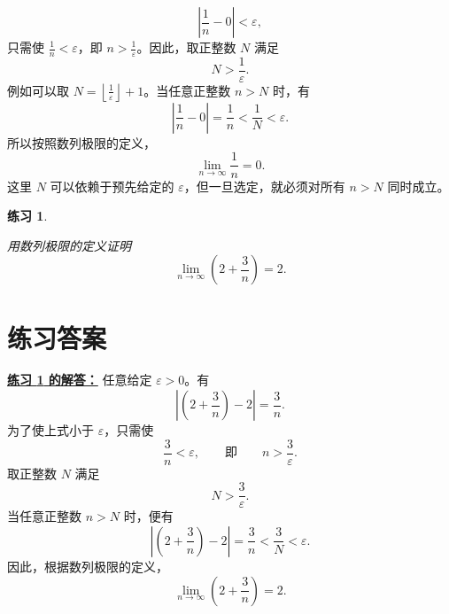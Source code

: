 \documentclass[UTF8,fontset=fandol,11pt]{ctexart}
\newtheorem{exercise}[definition]{练习}
\begin{document}
\[
\left|\frac{1}{n}-0\right|<\varepsilon,
\]
只需使 $\frac{1}{n}<\varepsilon$，即 $n>\frac{1}{\varepsilon}$。因此，取正整数 $N$ 满足
\[
N>\frac{1}{\varepsilon}.
\]
例如可以取 $N=\left\lfloor\frac{1}{\varepsilon}\right\rfloor+1$。当任意正整数 $n>N$ 时，有
\[
\left|\frac{1}{n}-0\right|=\frac{1}{n}<\frac{1}{N}<\varepsilon.
\]
所以按照数列极限的定义，
\[
\lim_{n\to\infty}\frac{1}{n}=0.
\tag{1}\label{eq:reciprocal-limit}
\]
这里 $N$ 可以依赖于预先给定的 $\varepsilon$，但一旦选定，就必须对所有 $n>N$ 同时成立。
\par
\begin{exercise}
\label{mathagent:exercise:00f3ca86b052020f03928eb8b6a5b7fd0cc5cf9711fabd7b41e6a358cfff3ed4}

用数列极限的定义证明
\[
\lim_{n\to\infty}\left(2+\frac{3}{n}\right)=2.
\]

\end{exercise}
\section*{练习答案}
\par\noindent\textbf{\hyperref[mathagent:exercise:00f3ca86b052020f03928eb8b6a5b7fd0cc5cf9711fabd7b41e6a358cfff3ed4]{练习 \ref*{mathagent:exercise:00f3ca86b052020f03928eb8b6a5b7fd0cc5cf9711fabd7b41e6a358cfff3ed4} 的解答：}}
任意给定 $\varepsilon>0$。有
\[
\left|\left(2+\frac{3}{n}\right)-2\right|=\frac{3}{n}.
\]
为了使上式小于 $\varepsilon$，只需使
\[
\frac{3}{n}<\varepsilon,
\qquad\text{即}\qquad
n>\frac{3}{\varepsilon}.
\]
取正整数 $N$ 满足
\[
N>\frac{3}{\varepsilon}.
\]
当任意正整数 $n>N$ 时，便有
\[
\left|\left(2+\frac{3}{n}\right)-2\right|
=\frac{3}{n}
<\frac{3}{N}
<\varepsilon.
\]
因此，根据数列极限的定义，
\[
\lim_{n\to\infty}\left(2+\frac{3}{n}\right)=2.
\]
\par
\end{document}
